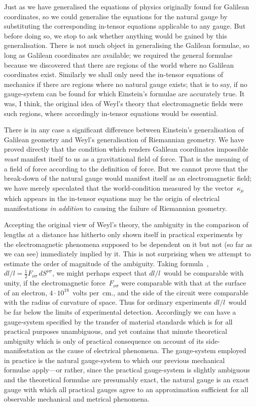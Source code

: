 \documentclass[12pt]{book}
\begin{document}
Just as we have generalised the equations of physics originally found for
Galilean coordinates, so we could generalise the equations for the natural
gauge by substituting the corresponding in-tensor equations applicable to
any gauge. But before doing so, we stop to ask whether anything would be
gained by this generalisation. There is not much object in generalising the
Galilean formulae, so long as Galilean coordinates are available; we required
the general formulae because we discovered that there are regions of the
world where no Galilean coordinates exist. Similarly we shall only need the
in-tensor equations of mechanics if there are regions where no natural
gauge exists; that is to say, if no gauge-system can be found for which
Einstein's formulae are accurately true. It was, I think, the original idea of
Weyl's theory that electromagnetic fields were such regions, where accordingly
in-tensor equations would be essential.

There is in any case a significant difference between Einstein's generalisation
of Galilean geometry and Weyl's generalisation of Riemannian
geometry. We have proved directly that the condition which renders Galilean
coordinates impossible \emph{must} manifest itself to us as a gravitational field of
force. That is the meaning of a field of force according to the definition of force.
But we cannot prove that the break-down of the natural gauge would manifest
itself as an electromagnetic field; we have merely speculated that the world-condition
measured by the vector~$\kappa_{\mu}$ which appears in the in-tensor equations
may be the origin of electrical manifestations \emph{in addition} to causing the
failure of Riemannian geometry.

Accepting the original view of Weyl's theory, the ambiguity in the
comparison of lengths at a distance has hitherto only shown itself in practical
experiments by the electromagnetic phenomena supposed to be dependent on
it but not (so far as we can see) immediately implied by it. This is not
surprising when we attempt to estimate the order of magnitude of the
ambiguity. Taking formula~, $dl/l = \frac{1}{2} F_{\nu\sigma}\, dS^{\nu\sigma}$, we might perhaps expect
that $dl/l$~would be comparable with unity, if the electromagnetic force~$F_{\nu\sigma}$
were comparable with that at the surface of an electron, $4 \cdot 10^{18}$~volts per~cm.,
and the side of the circuit were comparable with the radius of curvature of
space. Thus for ordinary experiments $dl/l$~would be far below the limits of
experimental detection. Accordingly we can have a gauge-system specified
by the transfer of material standards which is for all practical purposes
unambiguous, and yet contains that minute theoretical ambiguity which is
only of practical consequence on account of its side-manifestation as the
cause of electrical phenomena. The gauge-system employed in practice is
the natural gauge-system to which our previous mechanical formulae apply---or
rather, since the practical gauge-system is slightly ambiguous and the
theoretical formulae are presumably exact, the natural gauge is an exact
gauge with which all practical gauges agree to an approximation sufficient
for all observable mechanical and metrical phenomena.
\end{document}
